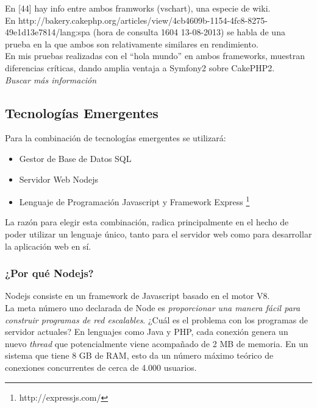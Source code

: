 En [44] hay info entre ambos framworks (vschart), una especie de wiki.\\

En http://bakery.cakephp.org/articles/view/4cb4609b-1154-4fc8-8275-49e1d13e7814/lang:spa (hora de consulta 1604 13-08-2013)
se habla de una prueba en la que ambos son relativamente similares en rendimiento.\\

En mis pruebas realizadas con el ``hola mundo'' en ambos frameworks, muestran diferencias críticas, dando
amplia ventaja a Symfony2 sobre CakePHP2.\\
\textit{Buscar más información}

\subsection{Tecnologías Emergentes}

Para la combinación de tecnologías emergentes se utilizará:

\begin{itemize}
 \item Gestor de Base de Datos SQL
 \item Servidor Web Nodejs
 \item Lenguaje de Programación Javascript y Framework Express \footnote{http://expressjs.com/}
\end{itemize}

La razón para elegir esta combinación, radica principalmente en el hecho de poder utilizar
un lenguaje único, tanto para el servidor web como para desarrollar la aplicación web en sí.\\




\subsubsection{¿Por qué Nodejs?}

Nodejs consiste en un framework de Javascript basado en el motor V8.\\

La meta número uno declarada de Node es \textit{proporcionar una manera fácil para construir 
programas de red escalables}. ¿Cuál es el problema con los programas de servidor actuales? 
En lenguajes como Java y PHP, cada conexión genera un nuevo \textit{thread} que potencialmente viene 
acompañado de 2 MB de memoria. En un sistema que tiene 8 GB de RAM, esto da un número máximo teórico 
de conexiones concurrentes de cerca de 4.000 usuarios.\\

